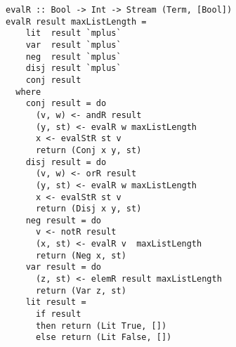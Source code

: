 

\begin{figure}[!t]
  \centering
  \begin{minipage}{0.49\textwidth}
    \begin{lstlisting}[label={eval_r}, caption={Functional implementation of the direction \lstinline{evalo out out in}}, captionpos=b, frame=tb]
evalR :: Bool -> Int -> Stream (Term, [Bool])
evalR result maxListLength =
    lit  result `mplus`
    var  result `mplus`
    neg  result `mplus`
    disj result `mplus`
    conj result
  where
    conj result = do
      (v, w) <- andR result
      (y, st) <- evalR w maxListLength
      x <- evalStR st v
      return (Conj x y, st)
    disj result = do
      (v, w) <- orR result
      (y, st) <- evalR w maxListLength
      x <- evalStR st v
      return (Disj x y, st)
    neg result = do
      v <- notR result
      (x, st) <- evalR v  maxListLength
      return (Neg x, st)
    var result = do
      (z, st) <- elemR result maxListLength
      return (Var z, st)
    lit result =
      if result
      then return (Lit True, [])
      else return (Lit False, [])
    \end{lstlisting}
  \end{minipage}
\end{figure}

